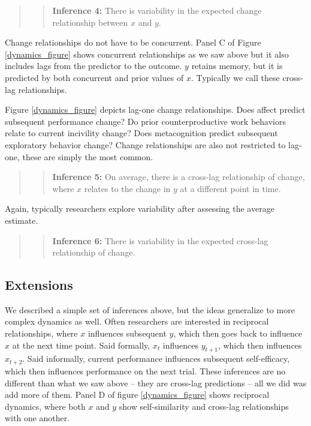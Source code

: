 \documentclass[english,,man]{apa6}
\theoremstyle{definition}
\theoremstyle{definition}
\theoremstyle{definition}
\theoremstyle{remark}
\begin{document}
\begin{quote}
\begin{quote}
\textbf{Inference 4:} There is variability in the expected change
relationship between \(x\) and \(y\).
\end{quote}
\end{quote}

Change relationships do not have to be concurrent. Panel C of Figure
\ref{dynamics_figure} shows concurrent relationships as we saw above but
it also includes lags from the predictor to the outcome. \(y\) retains
memory, but it is predicted by both concurrent and prior values of
\(x\). Typically we call these cross-lag relationships.

Figure \ref{dynamics_figure} depicts lag-one change relationships. Does
affect predict subsequent performance change? Do prior counterproductive
work behaviors relate to current incivility change? Does metacognition
predict subsequent exploratory behavior change? Change relationships are
also not restricted to lag-one, these are simply the most common.

\begin{quote}
\begin{quote}
\textbf{Inference 5:} On average, there is a cross-lag relationship of
change, where \(x\) relates to the change in \(y\) at a different point
in time.
\end{quote}
\end{quote}

Again, typically researchers explore variability after assessing the
average estimate.

\begin{quote}
\begin{quote}
\textbf{Inference 6:} There is variability in the expected cross-lag
relationship of change.
\end{quote}
\end{quote}

\hypertarget{extensions}{%
\subsection{Extensions}\label{extensions}}

We described a simple set of inferences above, but the ideas generalize
to more complex dynamics as well. Often researchers are interested in
reciprocal relationships, where \(x\) influences subsequent \(y\), which
then goes back to influence \(x\) at the next time point. Said formally,
\(x_t\) influences \(y_{t+1}\), which then influences \(x_{t+2}\). Said
informally, current performance influences subsequent self-efficacy,
which then influences performance on the next trial. These inferences
are no different than what we saw above -- they are cross-lag
predictions -- all we did was add more of them. Panel D of figure
\ref{dynamics_figure} shows reciprocal dynamics, where both \(x\) and
\(y\) show self-similarity and cross-lag relationships with one another.
\end{document}
